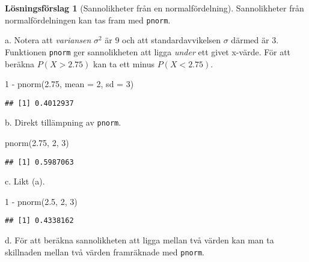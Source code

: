 \documentclass[
]{book}
\newenvironment{Shaded}{\begin{snugshade}}{\end{snugshade}}
\newcommand{\AttributeTok}[1]{\textcolor[rgb]{0.77,0.63,0.00}{#1}}
\newcommand{\DecValTok}[1]{\textcolor[rgb]{0.00,0.00,0.81}{#1}}
\newcommand{\FloatTok}[1]{\textcolor[rgb]{0.00,0.00,0.81}{#1}}
\newcommand{\FunctionTok}[1]{\textcolor[rgb]{0.00,0.00,0.00}{#1}}
\newcommand{\NormalTok}[1]{#1}
\newcommand{\SpecialCharTok}[1]{\textcolor[rgb]{0.00,0.00,0.00}{#1}}
\theoremstyle{definition}
\theoremstyle{definition}
\theoremstyle{definition}
\theoremstyle{definition}
\newtheorem{hypothesis}{Lösningsförslag}[chapter]
\theoremstyle{remark}
\begin{document}
\begin{hypothesis}[Sannolikheter från en normalfördelning]
Sannolikheter från normalfördelningen kan tas fram med \texttt{pnorm}.

a. Notera att \emph{variansen} \(\sigma^2\) är \(9\) och att standardavvikelsen \(\sigma\) därmed är \(3\). Funktionen \texttt{pnorm} ger sannolikheten att ligga \emph{under} ett givet x-värde. För att beräkna \(P(X > 2.75)\) kan ta ett minus \(P(X < 2.75)\).

\begin{Shaded}
\begin{Highlighting}[]
\DecValTok{1} \SpecialCharTok{{-}} \FunctionTok{pnorm}\NormalTok{(}\FloatTok{2.75}\NormalTok{, }\AttributeTok{mean =} \DecValTok{2}\NormalTok{, }\AttributeTok{sd =} \DecValTok{3}\NormalTok{)}
\end{Highlighting}
\end{Shaded}

\begin{verbatim}
## [1] 0.4012937
\end{verbatim}

b. Direkt tillämpning av \texttt{pnorm}.

\begin{Shaded}
\begin{Highlighting}[]
\FunctionTok{pnorm}\NormalTok{(}\FloatTok{2.75}\NormalTok{, }\DecValTok{2}\NormalTok{, }\DecValTok{3}\NormalTok{)}
\end{Highlighting}
\end{Shaded}

\begin{verbatim}
## [1] 0.5987063
\end{verbatim}

c. Likt (a).

\begin{Shaded}
\begin{Highlighting}[]
\DecValTok{1} \SpecialCharTok{{-}} \FunctionTok{pnorm}\NormalTok{(}\FloatTok{2.5}\NormalTok{, }\DecValTok{2}\NormalTok{, }\DecValTok{3}\NormalTok{)}
\end{Highlighting}
\end{Shaded}

\begin{verbatim}
## [1] 0.4338162
\end{verbatim}

d. För att beräkna sannolikheten att ligga mellan två värden kan man ta skillnaden mellan två värden framräknade med \texttt{pnorm}.


\end{hypothesis}
\end{document}
